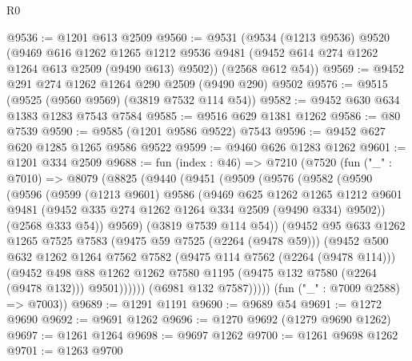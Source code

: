 \begin{lexlean}{R0}
\begin{coremodule}
@9536 := @1201 @613 @2509
@9560 := @9531
    (@9534
      (@1213 @9536)
      @9520
      (@9469
        @616
        @1262
        @1265
        @1212
        @9536
        @9481
        (@9452 @614 @274 @1262 @1264 @613 @2509 (@9490 @613) @9502))
      (@2568 @612 @54))
@9569 := @9452 @291 @274 @1262 @1264 @290 @2509 (@9490 @290) @9502
@9576 := @9515 (@9525 (@9560 @9569) (@3819 @7532 @114 @54))
@9582 := @9452 @630 @634 @1383 @1283 @7543 @7584
@9585 := @9516 @629 @1381 @1262
@9586 := @80 @7539
@9590 := @9585 (@1201 @9586 @9522) @7543
@9596 := @9452 @627 @620 @1285 @1265 @9586 @9522
@9599 := @9460 @626 @1283 @1262
@9601 := @1201 @334 @2509
@9688 := fun (index : @46) =>
  @7210
    (@7520
      (fun ("_" : @7010) =>
      @8079
        (@8825
          (@9440
            (@9451
              (@9509
                (@9576
                  (@9582
                    (@9590
                      (@9596
                        (@9599
                          (@1213 @9601)
                          @9586
                          (@9469
                            @625
                            @1262
                            @1265
                            @1212
                            @9601
                            @9481
                            (@9452 @335 @274 @1262 @1264 @334 @2509 (@9490 @334) @9502))
                          (@2568 @333 @54))
                        @9569)
                      (@3819 @7539 @114 @54))
                    (@9452
                      @95
                      @633
                      @1262
                      @1265
                      @7525
                      @7583
                      (@9475 @59 @7525 (@2264 (@9478 @59)))
                      (@9452
                        @500
                        @632
                        @1262
                        @1264
                        @7562
                        @7582
                        (@9475 @114 @7562 (@2264 (@9478 @114)))
                        (@9452
                          @498
                          @88
                          @1262
                          @1262
                          @7580
                          @1195
                          (@9475 @132 @7580 (@2264 (@9478 @132)))
                          @9501))))))
              (@6981 @132 @7587)))))
      (fun ("_" : @7009 @2588) => @7003))
@9689 := @1291 @1191
@9690 := @9689 @54
@9691 := @1272 @9690
@9692 := @9691 @1262
@9696 := @1270 @9692 (@1279 @9690 @1262)
@9697 := @1261 @1264
@9698 := @9697 @1262
@9700 := @1261 @9698 @1262
@9701 := @1263 @9700

\end{coremodule}
\end{lexlean}
